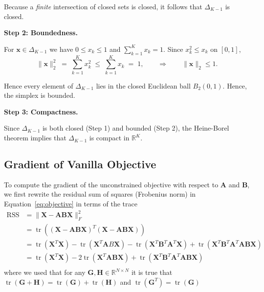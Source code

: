 \documentclass{article}
\begin{document}
Because a \emph{finite} intersection of closed sets is closed, it follows that $\Delta_{K-1}$ is closed.

\textbf{Step 2: Boundedness.}

For $\mathbf{x} \in \Delta_{K-1}$ we have $0\le x_k\le 1$ and $\sum_{k=1}^{K}x_k = 1$. Since $x_k^2\le x_k$ on $[0,1]$,
\begin{equation}
    \|\mathbf x\|_2^2
    \;=\;
    \sum_{k=1}^{K}x_k^2
    \;\le\;
    \sum_{k=1}^{K}x_k
    \;=\;
    1,
    \qquad\Longrightarrow\qquad
    \|\mathbf x\|_2\le 1.
\end{equation}

Hence every element of $\Delta_{K-1}$ lies in the closed Euclidean ball $B_2(0,1)$. Hence, the simplex is bounded.

\textbf{Step 3: Compactness.}

Since $\Delta_{K-1}$ is both closed (Step 1) and bounded (Step 2), the Heine-Borel theorem implies that $\Delta_{K-1}$ is compact in $\mathbb R^{K}$.

\subsection{Gradient of Vanilla Objective}
\label{subsec:gradient_vanilla_obj}

To compute the gradient of the unconstrained objective with respect to $\mathbf{A}$ and $\mathbf{B}$, we first rewrite the residual sum of squares (Frobenius norm) in Equation~\eqref{eq:objective} in terms of the trace\begin{equation}
    \begin{aligned}
        \operatorname{RSS} &= \| \mathbf{X} - \mathbf{A} \mathbf{B} \mathbf{X}\|_F^2 \\
        &= \operatorname{tr} \left( \left( \mathbf{X} - \mathbf{A} \mathbf{B} \mathbf{X} \right)^T \left( \mathbf{X} - \mathbf{A} \mathbf{B} \mathbf{X} \right) \right) \\
        &=  \operatorname{tr}(\mathbf{X}^T \mathbf{X}) - \operatorname{tr}(\mathbf{X}^T \mathbf{A} B \mathbf{X}) - \operatorname{tr}(\mathbf{X}^T \mathbf{B}^T \mathbf{A}^T \mathbf{X}) + \operatorname{tr}(\mathbf{X}^T \mathbf{B}^T \mathbf{A}^T \mathbf{A} \mathbf{B} \mathbf{X}) \\
        &=  \operatorname{tr}(\mathbf{X}^T \mathbf{X}) - 2 \operatorname{tr}(\mathbf{X}^T \mathbf{A} \mathbf{B} \mathbf{X}) + \operatorname{tr}(\mathbf{X}^T \mathbf{B}^T \mathbf{A}^T \mathbf{A} \mathbf{B} \mathbf{X}) \\
    \end{aligned}
\end{equation}
where we used that for any $\mathbf{G}, \mathbf{H} \in \mathbb{R}^{N \times N}$ it is true that $\operatorname{tr}(\mathbf{G} + \mathbf{H}) = \operatorname{tr}(\mathbf{G})+\operatorname{tr}(\mathbf{H})$ and $\operatorname{tr}(\mathbf{G}^T)=\operatorname{tr}(\mathbf{G})$
\end{document}
